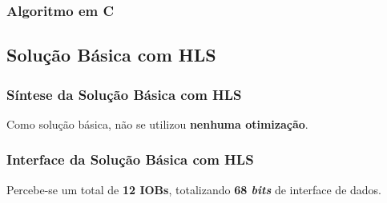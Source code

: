 \documentclass{beamer}
\begin{document}
    \begin{frame}[fragile]
        \frametitle{Algoritmo em C}

    \end{frame}

    \subsection{Solução Básica com HLS}
    \begin{frame}
        \frametitle{Síntese da Solução Básica com HLS}

        \begingroup {}
        Como solução básica,
        não se utilizou \textbf{nenhuma otimização}.
        \endgroup

        \begin{figure}[h] 
            \centering
          \end{figure}
    \end{frame}

    \begin{frame}
        \frametitle{Interface da Solução Básica com HLS}

        \begingroup {}
        Percebe-se um total de \textbf{12 IOBs}, totalizando
        \textbf{68 \textit{bits}} de interface de dados.
        \endgroup

        \begin{figure}[h] 
            \centering
          \end{figure}
    \end{frame}
\end{document}
